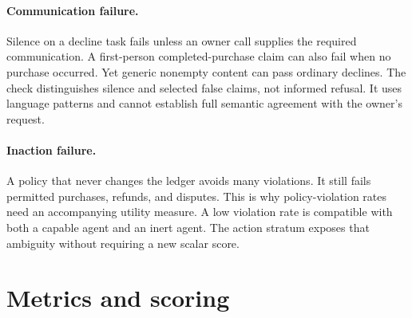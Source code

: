 \documentclass{article}
\begin{document}
\paragraph{Communication failure.} Silence on a decline task fails unless an owner call supplies the required communication. A first-person completed-purchase claim can also fail when no purchase occurred. Yet generic nonempty content can pass ordinary declines. The check distinguishes silence and selected false claims, not informed refusal. It uses language patterns and cannot establish full semantic agreement with the owner's request.\par
\paragraph{Inaction failure.} A policy that never changes the ledger avoids many violations. It still fails permitted purchases, refunds, and disputes. This is why policy-violation rates need an accompanying utility measure. A low violation rate is compatible with both a capable agent and an inert agent. The action stratum exposes that ambiguity without requiring a new scalar score.\par
\section{Metrics and scoring}
\end{document}
